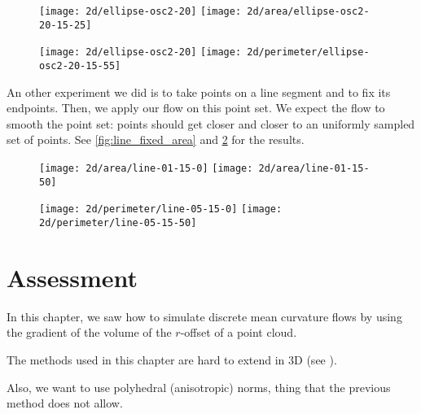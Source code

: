 \begin{figure}[h]
    \centering

    \texttt{[image: 2d/ellipse-osc2-20]}
    \texttt{[image: 2d/area/ellipse-osc2-20-15-25]}
    \label{fig:ellipse_osc2_area_flow}

    \texttt{[image: 2d/ellipse-osc2-20]}
    \texttt{[image: 2d/perimeter/ellipse-osc2-20-15-55]}
    \label{fig:ellipse_osc2_perimeter_flow}
\end{figure}


An other experiment we did is to take points on a line segment and to fix its
endpoints. Then, we apply our flow on this point set. We expect the flow to
smooth the point set: points should get closer and closer to an uniformly
sampled set of points. See \ref{fig:line_fixed_area} and
\ref{fig:line_fixed_perimeter} for the results.

\begin{figure}[h]
    \centering

    \texttt{[image: 2d/area/line-01-15-0]}
    \texttt{[image: 2d/area/line-01-15-50]}
    \label{fig:line_fixed_area}

    \texttt{[image: 2d/perimeter/line-05-15-0]}
    \texttt{[image: 2d/perimeter/line-05-15-50]}
    \label{fig:line_fixed_perimeter}
\end{figure}


\section{Assessment}

In this chapter, we saw how to simulate discrete mean curvature flows by using
the gradient of the volume of the $r$-offset of a point cloud.

The methods used in this chapter are hard to extend in 3D (see
\cite{cazals2011computing}).

Also, we want to use polyhedral (anisotropic) norms, thing that the previous
method does not allow.


